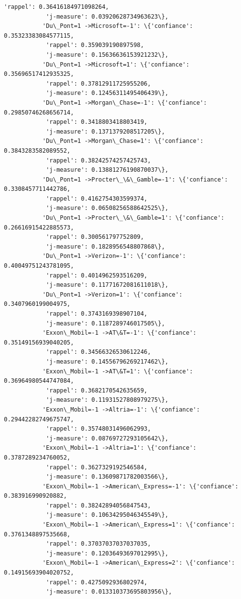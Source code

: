\documentclass[11pt]{article}
\begin{document}
\begin{Verbatim}[commandchars=\\\{\}]
            'rappel': 0.36416184971098264,
            'j-measure': 0.03920628734963623\},
           'Du\_Pont=1 ->Microsoft=-1': \{'confiance': 0.35323383084577115,
            'rappel': 0.359039190897598,
            'j-measure': 0.15636636153921232\},
           'Du\_Pont=1 ->Microsoft=1': \{'confiance': 0.35696517412935325,
            'rappel': 0.37812911725955206,
            'j-measure': 0.12456311495406439\},
           'Du\_Pont=1 ->Morgan\_Chase=-1': \{'confiance': 0.29850746268656714,
            'rappel': 0.3418803418803419,
            'j-measure': 0.1371379208517205\},
           'Du\_Pont=1 ->Morgan\_Chase=1': \{'confiance': 0.3843283582089552,
            'rappel': 0.38242574257425743,
            'j-measure': 0.13881276190870037\},
           'Du\_Pont=1 ->Procter\_\&\_Gamble=-1': \{'confiance': 0.3308457711442786,
            'rappel': 0.4162754303599374,
            'j-measure': 0.06508256588642525\},
           'Du\_Pont=1 ->Procter\_\&\_Gamble=1': \{'confiance': 0.26616915422885573,
            'rappel': 0.300561797752809,
            'j-measure': 0.1828956548807868\},
           'Du\_Pont=1 ->Verizon=-1': \{'confiance': 0.40049751243781095,
            'rappel': 0.4014962593516209,
            'j-measure': 0.11771672081611018\},
           'Du\_Pont=1 ->Verizon=1': \{'confiance': 0.3407960199004975,
            'rappel': 0.3743169398907104,
            'j-measure': 0.1187289746017505\},
           'Exxon\_Mobil=-1 ->AT\&T=-1': \{'confiance': 0.35149156939040205,
            'rappel': 0.34566326530612246,
            'j-measure': 0.14556796269217462\},
           'Exxon\_Mobil=-1 ->AT\&T=1': \{'confiance': 0.36964980544747084,
            'rappel': 0.3682170542635659,
            'j-measure': 0.11931527808979275\},
           'Exxon\_Mobil=-1 ->Altria=-1': \{'confiance': 0.29442282749675747,
            'rappel': 0.35748031496062993,
            'j-measure': 0.08769727293105642\},
           'Exxon\_Mobil=-1 ->Altria=1': \{'confiance': 0.3787289234760052,
            'rappel': 0.3627329192546584,
            'j-measure': 0.13609871782003566\},
           'Exxon\_Mobil=-1 ->American\_Express=-1': \{'confiance': 0.383916990920882,
            'rappel': 0.38242894056847543,
            'j-measure': 0.10634295046345549\},
           'Exxon\_Mobil=-1 ->American\_Express=1': \{'confiance': 0.3761348897535668,
            'rappel': 0.37037037037037035,
            'j-measure': 0.12036493697012995\},
           'Exxon\_Mobil=-1 ->American\_Express=2': \{'confiance': 0.14915693904020752,
            'rappel': 0.4275092936802974,
            'j-measure': 0.013310373695803956\},

\end{Verbatim}
\end{document}
